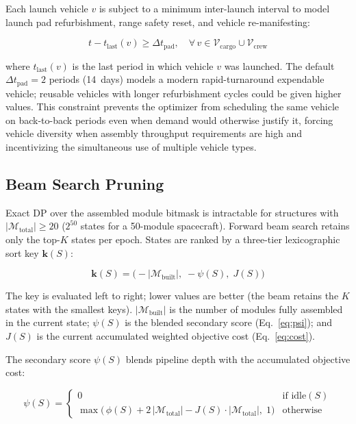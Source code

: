 Each launch vehicle $v$ is subject to a minimum inter-launch
interval to model launch pad refurbishment, range safety reset,
and vehicle re-manifesting:

\begin{equation}
  t - t_{\mathrm{last}}(v) \geq \Delta t_{\mathrm{pad}},
  \quad \forall\, v \in \mathcal{V}_{\mathrm{cargo}} \cup
  \mathcal{V}_{\mathrm{crew}}
\end{equation}

\noindent where $t_{\mathrm{last}}(v)$ is the last period in which
vehicle $v$ was launched.
The default $\Delta t_{\mathrm{pad}} = 2$ periods (14~days) models
a modern rapid-turnaround expendable vehicle; reusable vehicles
with longer refurbishment cycles could be given higher values.
This constraint prevents the optimizer from scheduling the same
vehicle on back-to-back periods even when demand would otherwise
justify it, forcing vehicle diversity when assembly throughput
requirements are high and incentivizing the simultaneous use of
multiple vehicle types.

\subsection{Beam Search Pruning}
\label{sec:beam}

Exact DP over the assembled module bitmask is intractable for
structures with $|\mathcal{M}_{\mathrm{total}}| \geq 20$
($2^{50}$ states for a 50-module spacecraft). Forward beam search
retains only the top-$K$ states per epoch. States are ranked by a
three-tier lexicographic sort key $\mathbf{k}(S)$:

\begin{equation}
  \mathbf{k}(S) = \bigl(
    -|\mathcal{M}_{\mathrm{built}}|,\;
    -\psi(S),\;
    J(S)
  \bigr)
  \label{eq:beamsort}
\end{equation}

\noindent The key is evaluated left to right; lower values are
better (the beam retains the $K$ states with the smallest keys).
$|\mathcal{M}_{\mathrm{built}}|$ is the number of modules fully
assembled in the current state; $\psi(S)$ is the blended secondary
score (Eq.~\ref{eq:psi}); and $J(S)$ is the current accumulated
weighted objective cost (Eq.~\ref{eq:cost}).

The secondary score $\psi(S)$ blends pipeline depth with the
accumulated objective cost:

\begin{equation}
  \psi(S) =
  \begin{cases}
    0
      & \text{if idle}(S) \\[4pt]
    \max\!\bigl(\,\phi(S)
               + 2\,|\mathcal{M}_{\mathrm{total}}|
               - J(S)\cdot|\mathcal{M}_{\mathrm{total}}|,\;1\bigr)
      & \text{otherwise}
  \end{cases}
  \label{eq:psi}
\end{equation}

